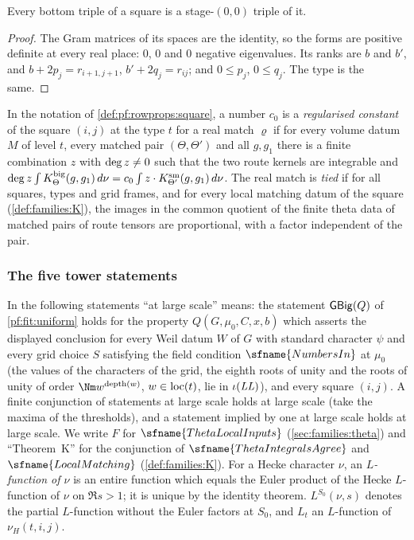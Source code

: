 \begin{lemma}\label{pf:sh-theta:botstage}
Every bottom triple of a square is a stage-$(0,0)$ triple of it.
\end{lemma}

\begin{proof}
The Gram matrices of its spaces are the identity, so the forms are positive definite at every real place: $0$, $0$ and $0$
negative eigenvalues. Its ranks are $b$ and $b'$, and $b+2p_j=r_{i+1,j+1}$, $b'+2q_j=r_{ij}$; and $0\le p_j$, $0\le q_j$. The type
is the same.
\end{proof}

\begin{definition}\label{pf:sh-theta:reg}
In the notation of \cref{def:pf:rowprops:square}, a number $c_0$ is a \emph{regularised constant} of the square $(i,j)$
at the type $t$ for a real match $\varrho$ if for every volume datum $M$ of level $t$, every matched pair
$(\Theta,\Theta')$ and all $g,g_1$ there is a finite combination $z$ with $\deg z\ne0$ such that the two route
kernels are integrable and
$\deg z\int K^{\mathrm{big}}_\Theta(g,g_1)\,d\nu=c_0\int z\cdot K^{\mathrm{sm}}_{\Theta'}(g,g_1)\,d\nu$. The real
match is \emph{tied} if for all squares, types and grid frames, and for every local matching datum of the square
(\cref{def:families:K}), the images in the common quotient of the finite theta data of matched pairs of route tensors
are proportional, with a factor independent of the pair.
\end{definition}

\subsubsection{The five tower statements}

In the following statements ``at large scale'' means: the statement $\mathsf{GBig}(Q)$ of \cref{pf:fit:uniform} holds for
the property $Q(G,\mu_0,C,x,b)$ which asserts the displayed conclusion for every Weil datum $W$ of $G$ with standard
character $\psi$ and every grid choice $S$ satisfying the field condition $\sfname{NumbersIn}$ at $\mu_0$ (the values of
the characters of the grid, the eighth roots of unity and the roots of unity of order $\Nm w^{\mathrm{depth}(w)}$,
$w\in\mathrm{loc}(t)$, lie in $\iota(\mathit{LL})$), and every square $(i,j)$. A finite conjunction of statements at
large scale holds at large scale (take the maxima of the thresholds), and a statement implied by one at large scale holds
at large scale. We write $F$ for
$\sfname{ThetaLocalInputs}$ (\cref{sec:families:theta}) and ``Theorem~K'' for the conjunction of
$\sfname{ThetaIntegralsAgree}$ and $\sfname{LocalMatching}$ (\cref{def:families:K}). For a Hecke character $\nu$, an
\emph{$L$-function of $\nu$} is an entire function which equals the Euler product of the Hecke $L$-function of $\nu$ on
$\Re s>1$; it is unique by the identity theorem. $L^{S_0}(\nu,s)$ denotes the partial $L$-function without the Euler
factors at $S_0$, and $L_t$ an $L$-function of $\nu_H(t,i,j)$.

